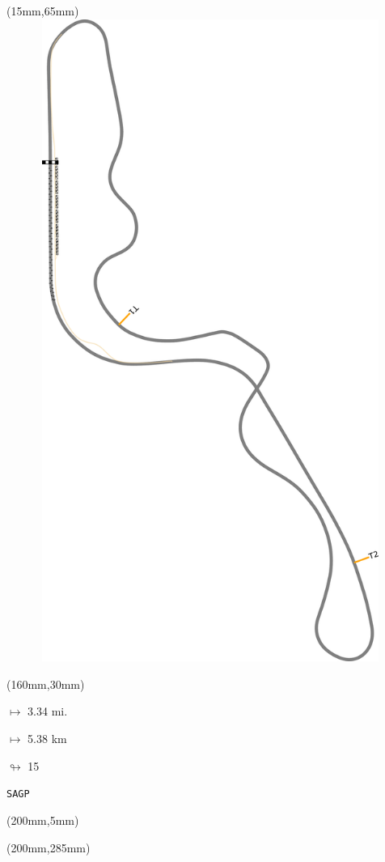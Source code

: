 \begin{textblock*}{185mm}(15mm,65mm)%
\centering
\mbox{\includegraphics[width=185mm,height=210mm,keepaspectratio]{PT/SAGP.pdf}}
\end{textblock*}
\begin{textblock*}{40mm}(160mm,30mm)%
\Large
\par$\mapsto$ 3.34 mi.
\par$\mapsto$ 5.38 km
\par$\looparrowright$ 15
\par\hfill\tiny\tt SAGP\\
\end{textblock*}
\begin{textblock*}{20mm}(200mm,5mm)%
\fbox{\thepage}
\label{SAGP}
\end{textblock*}
\begin{textblock*}{20mm}(200mm,285mm)%
\fbox{\thepage}
\end{textblock*}

